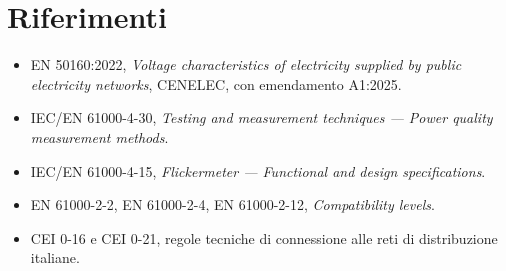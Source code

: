 \section*{Riferimenti}

\begin{itemize}[itemsep=2pt]
  \item EN 50160:2022, \textit{Voltage characteristics of electricity supplied by
        public electricity networks}, CENELEC, con emendamento A1:2025.
  \item IEC/EN 61000-4-30, \textit{Testing and measurement techniques ---
        Power quality measurement methods}.
  \item IEC/EN 61000-4-15, \textit{Flickermeter --- Functional and design specifications}.
  \item EN 61000-2-2, EN 61000-2-4, EN 61000-2-12, \textit{Compatibility levels}.
  \item CEI 0-16 e CEI 0-21, regole tecniche di connessione alle reti di distribuzione
        italiane.
\end{itemize}

